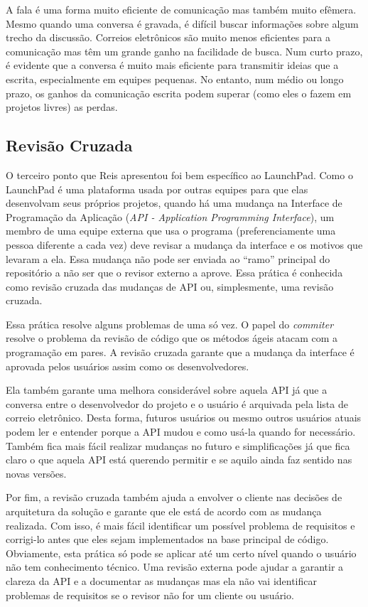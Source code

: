 A fala é uma forma muito eficiente de comunicação mas também muito
efêmera. Mesmo quando uma conversa é gravada, é difícil buscar
informações sobre algum trecho da discussão. Correios eletrônicos são
muito menos eficientes para a comunicação mas têm um grande ganho na
facilidade de busca. Num curto prazo, é evidente que a conversa é
muito mais eficiente para transmitir ideias que a escrita,
especialmente em equipes pequenas. No entanto, num médio ou longo
prazo, os ganhos da comunicação escrita podem superar (como eles o
fazem em projetos livres) as perdas.

\subsection{Revisão Cruzada}
\label{subsec:crossrev}

O terceiro ponto que Reis apresentou foi bem específico ao
LaunchPad. Como o LaunchPad é uma plataforma usada por outras equipes
para que elas desenvolvam seus próprios projetos, quando há uma
mudança na Interface de Programação da Aplicação (\emph{API -
  Application Programming Interface}), um membro de uma equipe externa
que usa o programa (preferenciamente uma pessoa diferente a cada vez)
deve revisar a mudança da interface e os motivos que levaram a
ela. Essa mudança não pode ser enviada ao ``ramo'' principal do
repositório a não ser que o revisor externo a aprove. Essa prática é
conhecida como revisão cruzada das mudanças de API ou, simplesmente,
uma revisão cruzada.

Essa prática resolve alguns problemas de uma só vez. O papel do
\emph{commiter} resolve o problema da revisão de código que os métodos
ágeis atacam com a programação em pares. A revisão cruzada garante que
a mudança da interface é aprovada pelos usuários assim como os
desenvolvedores.

Ela também garante uma melhora considerável sobre aquela API já que a
conversa entre o desenvolvedor do projeto e o usuário é arquivada pela
lista de correio eletrônico. Desta forma, futuros usuários ou mesmo
outros usuários atuais podem ler e entender porque a API mudou e como
usá-la quando for necessário. Também fica mais fácil realizar mudanças
no futuro e simplificações já que fica claro o que aquela API está
querendo permitir e se aquilo ainda faz sentido nas novas versões.

Por fim, a revisão cruzada também ajuda a envolver o cliente nas
decisões de arquitetura da solução e garante que ele está de acordo
com as mudança realizada. Com isso, é mais fácil identificar um
possível problema de requisitos e corrigi-lo antes que eles sejam
implementados na base principal de código. Obviamente, esta prática só
pode se aplicar até um certo nível quando o usuário não tem
conhecimento técnico. Uma revisão externa pode ajudar a garantir a
clareza da API e a documentar as mudanças mas ela não vai identificar
problemas de requisitos se o revisor não for um cliente ou usuário.

